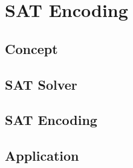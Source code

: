 \section{SAT Encoding}
\subsection{Concept}
\subsection{SAT Solver}
\subsection{SAT Encoding}
\subsection{Application}